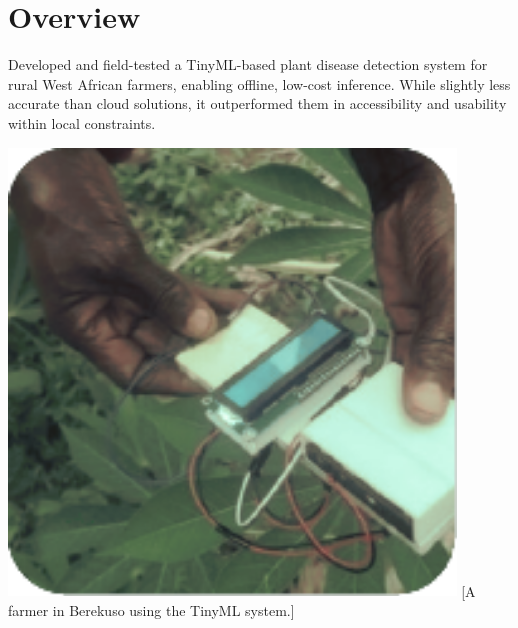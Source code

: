 \documentclass[../../main]{subfiles}
\begin{document}
\section{Overview} \label{sec:}

\begin{minipage} {0.62\textwidth}
    \vspace{-0.8cm}

    Developed and field-tested a TinyML-based plant disease detection system for
    rural West African farmers, enabling offline, low-cost inference. While
    slightly less accurate than cloud solutions, it outperformed them in
    accessibility and usability within local constraints.

\end{minipage}
\hfill
\begin{minipage} {0.35\textwidth}
    \begin{center}
        \vspace{-1.2cm}
        \includegraphics[width = 0.89\textwidth] {pics/disease_detection.pdf}
        [A farmer in Berekuso using the TinyML system.]{}
        \label{fig:case1Pic}
    \end{center}
\end{minipage}
\end{document}
